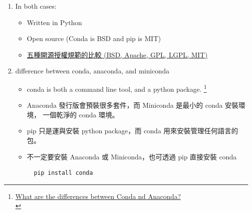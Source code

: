\documentclass[a4paper,12pt]{article}
\begin{document}
\begin{enumerate}
\begin{itemize}
\item 傳統 Python 使用者以 pip 作為套件管理員（package manager）、以 venv 作為工作環境管理員（environment manager），而 conda 則達成了「兩個願望、一次滿足」既可以管理套件亦能夠管理工作環境。\footnote{\href{https://medium.com/datainpoint/python-essentials-conda-quickstart-1f1e9ecd1025}{輕鬆學習 Python：conda 的核心功能}\\\label{org9a526ba}}\\
\end{itemize}
\item In both cases:
\label{sec:orgdc4f94f}
\begin{itemize}
\item Written in Python\\
\item Open source (Conda is BSD and pip is MIT)\\
\item \href{http://inspiregate.com/internet/trends/74-comparison-of-five-kinds-of-standard-open-source-license-bsd-apache-gpl-lgpl-mit.html}{五種開源授權規範的比較 (BSD, Apache, GPL, LGPL, MIT)}\\
\end{itemize}
\item difference between conda, anaconda, and miniconda
\label{sec:org9e1cd09}
\begin{itemize}
\item conda is both a command line tool, and a python package. \footnote{\href{https://stackoverflow.com/questions/30034840/what-are-the-differences-between-conda-and-anaconda}{What are the differences between Conda nd Anaconda?}\\}\\
\item Anaconda 發行版會預裝很多套件，而 Miniconda 是最小的 conda 安裝環境， 一個乾淨的 conda 環境。\\
\item pip  只是運與安裝 python package，而 conda 用來安裝管理任何語言的包。\\
\item 不一定要安裝 Anaconda 或 Miniconda，也可透過 pip 直接安裝 conda\\
\lstset{breaklines=true,language=shell,label= ,caption= ,captionpos=b,numbers=none}
\begin{lstlisting}
  pip install conda
\end{lstlisting}
\end{itemize}
\end{enumerate}
\end{document}
